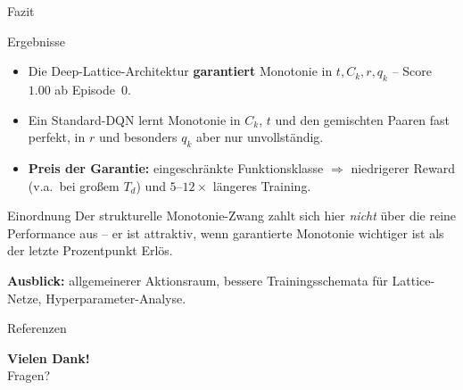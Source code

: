 \documentclass[aspectratio=169, 11pt]{beamer}
\begin{document}
\begin{frame}{Fazit}
  \begin{block}{Ergebnisse}
    \begin{itemize}
      \item Die Deep-Lattice-Architektur \textbf{garantiert} Monotonie in $t, C_k, r, q_k$ -- Score $1.00$ ab Episode~0.
      \item Ein Standard-DQN lernt Monotonie in $C_k$, $t$ und den gemischten Paaren fast perfekt,
            in $r$ und besonders $q_k$ aber nur unvollständig.
      \item \textbf{Preis der Garantie:} eingeschränkte Funktionsklasse $\Rightarrow$ niedrigerer Reward
            (v.a.\ bei großem $T_d$) und $5$--$12\times$ längeres Training.
    \end{itemize}
  \end{block}

  \begin{block}{Einordnung}
    Der strukturelle Monotonie-Zwang zahlt sich hier \emph{nicht} über die reine Performance aus --
    er ist attraktiv, wenn garantierte Monotonie wichtiger ist als der letzte Prozentpunkt Erlös.
  \end{block}

  {\small\textbf{Ausblick:} allgemeinerer Aktionsraum, bessere Trainingsschemata für Lattice-Netze, Hyperparameter-Analyse.}
\end{frame}

\begin{frame}[allowframebreaks]{Referenzen}
  \printbibliography[heading=none]
\end{frame}

\begin{frame}[plain]
  \begin{center}
    {\Huge\textbf{Vielen Dank!}}\\[1em]
    {\large Fragen?}
  \end{center}
\end{frame}
\end{document}
